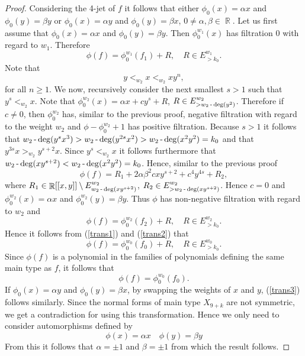 \documentclass[noend]{amsproc}
\theoremstyle{definition}
\DeclareMathOperator{\R}{\mathbb{R}}
\DeclareMathOperator{\dash}{\textnormal{-}}
\begin{document}
\begin{proof}
Considering the 4-jet of $f$ it follows that either $\phi_0(x)=\alpha x$ and $\phi_0(y)=\beta y$ or $\phi_0(x)=\alpha y$ and $\phi_0(y)=\beta x$, $0\neq\alpha,\beta\in\R$. Let us first assume that $\phi_0(x)=\alpha x$ and $\phi_0(y)=\beta y$. Then $\phi^{w_1}_0(x)$ has filtration $0$ with regard to $w_1$. Therefore
\begin{equation}\label{trans1}
\phi(f)=\phi_0^{w_1}(f_1)+R,\quad R\in E^{w_1}_{>k_0}.
\end{equation} Note that
\begin{equation}\label{orderw1}
y<_{w_2}x<_{w_2}xy^n,
\end{equation}
for all $n\ge 1$. We now, recursively consider the next smallest $s>1$ such that $y^s<_{w_2}x$. Note that $\phi_0^{w_2}(x)=\alpha x+cy^s+R$, $R\in E^{w_2}_{>w_2\dash\deg(y^2)}$. Therefore if $c\neq 0$, then $\phi_0^{w_2}$ has, similar to the previous proof, negative filtration with regard to the weight $w_2$ and $\phi-\phi^{w_2}_0+1$ has positive filtration. Because $s>1$ it follows that $w_2\dash\deg(y^sx^3)>w_2\dash\deg(y^{2s}x^2)>w_2\dash\deg(x^2y^2)=k_0$ and that $y^{3s}x>_{w_2}y^{s+2}x$. Since $y^s<_{w_2}x$ it follows furthermore that $w_2\dash\deg(xy^{s+2})<w_2\dash\deg(x^2y^2)=k_0$. Hence, similar to the previous proof
\begin{equation}
\phi(f)=R_1+2\alpha\beta^2 cxy^{s+2}+c^4y^{4s}+R_2,
\end{equation}
where $R_1\in\R[[x,y]]\setminus E_{w_2\dash\deg(xy^{s+2})}^{w_2}$, $R_2\in E_{>w_2\dash\deg(xy^{s+2})}^{w_2}$.
Hence $c=0$ and $\phi_0^{w_2}(x)=\alpha x$ and $\phi_0^ {w_2}(y)=\beta y$. Thus $\phi$ has non-negative filtration with regard to $w_2$ and
\begin{equation}\label{trans2}
\phi(f)=\phi_0^{w_2}(f_2)+R,\quad R\in E^{w_2}_{>k_0}.
\end{equation}
Hence it follows from (\ref{trans1}) and (\ref{trans2}) that
\begin{equation}
\phi(f)=\phi_0^{w_0}(f_0)+R,\quad R\in E^{w_0}_{>k_0}.
\end{equation}
Since $\phi(f)$ is a polynomial in the families of polynomials defining the same main type as $f$, it follows that
\begin{equation}\label{trans3}
\phi(f)=\phi_0^{w_0}(f_0).
\end{equation}
If $\phi_0(x)=\alpha y$ and $\phi_0(y)=\beta x$, by swapping the weights of $x$ and $y$, (\ref{trans3}) follows similarly.  Since the normal forms of main type $X_{9+k}$ are not symmetric, we get a contradiction for using this transformation. Hence we only need to consider automorphisms defined by
\begin{equation}\label{phi}
\phi(x)=\alpha x\quad\phi(y)=\beta y
\end{equation}
 From this it follows that $\alpha=\pm 1$ and $\beta=\pm 1$ from which the result follows.
\end{proof}
\end{document}
